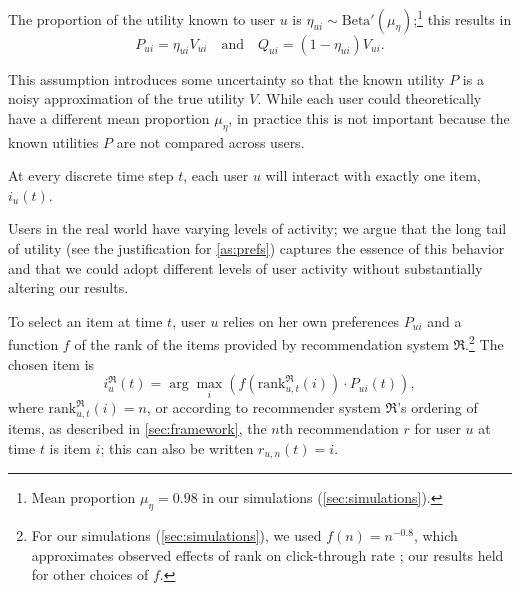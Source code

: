 \documentclass[sigconf]{acmart}
\begin{document}
\begin{assumption}
The proportion of the utility known to user $u$ is $\eta_{ui} \sim \mbox{Beta}'(\mu_{\eta})$;\footnote{Mean proportion $\mu_{\eta}=0.98$ in our simulations (\cref{sec:simulations}).}
this results in 
\begin{equation}
P_{ui} = \eta_{ui} V_{ui}
\quad
\mbox{and}
\quad
Q_{ui} = (1-\eta_{ui}) V_{ui}.
\end{equation}
\end{assumption}

\vspace{-3px}
This assumption introduces some uncertainty so that the known utility $P$ is a noisy approximation of the true utility $V$.  While each user could theoretically have a different mean proportion $\mu_{\eta}$, in practice this is not important because the known utilities $P$ are not compared across users.

\begin{assumption}
	At every discrete time step $t$, each user $u$ will interact with exactly one item, $i_{u}(t)$.
\label{as:one_item}
\end{assumption}

\vspace{-3px}
Users in the real world have varying levels of activity; 
we argue that the long tail of utility (see the justification for \cref{as:prefs}) captures the essence of this behavior and that we could adopt different levels of user activity without substantially altering our results.

\begin{definition}
To select an item at time $t$, user $u$ relies on her own preferences $P_{ui}$ and a function $f$ of the rank of the items provided by recommendation system $\mathfrak{R}$.\footnote{For our simulations (\cref{sec:simulations}), we used $f(n) = n^{-0.8}$, which approximates observed effects of rank on click-through rate \cite{jansen2013effect}; our results held for other choices of $f$.}  The chosen item is
\begin{equation}
	i^\mathfrak{R}_u(t) = \arg\max_i \left( f\left(\mbox{rank}^\mathfrak{R}_{u,t}(i)\right) \cdot P_{ui}(t)  \right),
\label{eq:choice}
\end{equation}
where $\mbox{rank}^\mathfrak{R}_{u,t}(i) = n$, or according to recommender system $\mathfrak{R}$'s ordering of items, as described in \cref{sec:framework}, the $n$th recommendation $r$ for user $u$ at time $t$ is item $i$; this can also be written $r_{u,n}(t) = i$.
\end{definition}
\end{document}
